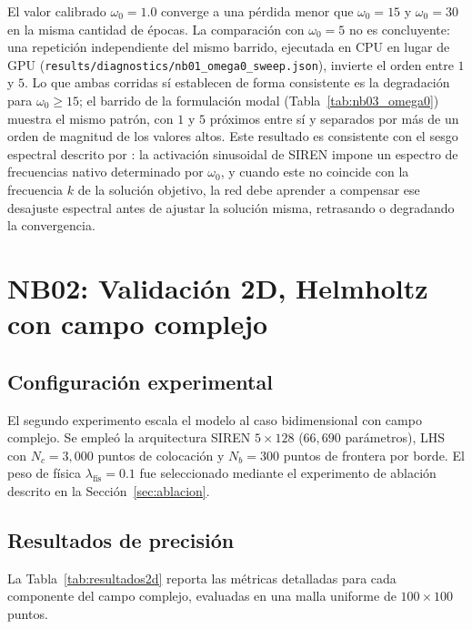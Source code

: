 El valor calibrado $\omega_0 = 1.0$ converge a una pérdida menor que
$\omega_0 = 15$ y $\omega_0 = 30$ en la misma cantidad de épocas. La
comparación con $\omega_0 = 5$ no es concluyente: una repetición independiente
del mismo barrido, ejecutada en CPU en lugar de GPU
(\texttt{results/diagnostics/nb01\_omega0\_sweep.json}), invierte el orden entre
$1$ y $5$. Lo que ambas corridas sí establecen de forma consistente es la
degradación para $\omega_0 \geq 15$; el barrido de la formulación modal
(Tabla~\ref{tab:nb03_omega0}) muestra el mismo patrón, con $1$ y $5$ próximos
entre sí y separados por más de un orden de magnitud de los valores altos. Este resultado es consistente con el sesgo espectral
descrito por \textcite{rahaman2019spectral}: la activación sinusoidal de
SIREN impone un espectro de frecuencias nativo determinado por $\omega_0$, y
cuando este no coincide con la frecuencia $k$ de la solución objetivo, la red
debe aprender a compensar ese desajuste espectral antes de ajustar la
solución misma, retrasando o degradando la convergencia.

\section{NB02: Validación 2D, Helmholtz con campo complejo}
\label{sec:resultados2d}

\subsection{Configuración experimental}

El segundo experimento escala el modelo al caso bidimensional con campo complejo.
Se empleó la arquitectura SIREN $5 \times 128$ ($66{,}690$ parámetros), LHS
con $N_c = 3{,}000$ puntos de colocación y $N_b = 300$ puntos de frontera por
borde. El peso de física $\lambda_\text{fís} = 0.1$ fue seleccionado mediante
el experimento de ablación descrito en la Sección~\ref{sec:ablacion}.

\subsection{Resultados de precisión}

La Tabla~\ref{tab:resultados2d} reporta las métricas detalladas para cada
componente del campo complejo, evaluadas en una malla uniforme de
$100 \times 100$ puntos.

